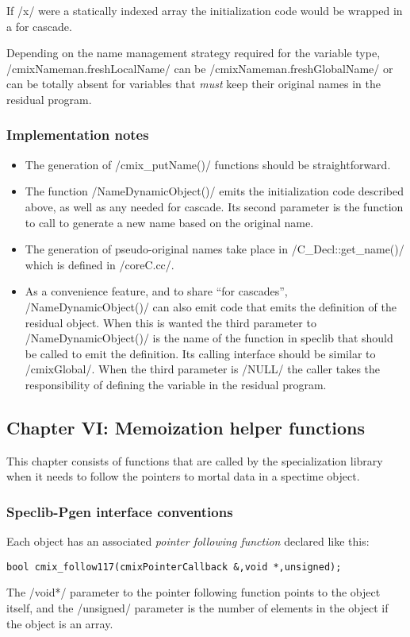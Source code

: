 \begin{docpart}
If /x/ were a statically indexed array the initialization code would
be wrapped in a for cascade.

Depending on the name management strategy required for the variable
type, /cmixNameman.freshLocalName/ can be
/cmixNameman.freshGlobalName/ or can be totally absent for variables that
\emph{must} keep their original names in the residual program.

\subsubsection{Implementation notes}
\begin{itemize}
\item The generation of /cmix_putName()/ functions should be
straightforward.
\item The function /NameDynamicObject()/ emits the initialization code
described above, as well as any needed for cascade. Its second
parameter is the function to call to generate a new name based on
the original name.
\item The generation of pseudo-original names take place in
/C_Decl::get_name()/ which is defined in /coreC.cc/.
\item As a convenience feature, and to share ``for cascades'',
/NameDynamicObject()/ can also emit code that emits the definition
of the residual object. When this is wanted the third parameter
to /NameDynamicObject()/ is the name of the function in speclib that
should be called to emit the definition. Its calling interface should
be similar to /cmixGlobal/. When the third parameter is /NULL/ the
caller takes the responsibility of defining the variable in the
residual program.
\end{itemize}

\subsection{Chapter VI: Memoization helper functions}
This chapter consists of functions that are called by the
specialization library when it needs to follow the
pointers to mortal data in a spectime object.

\subsubsection{Speclib-Pgen interface conventions}
Each object
has an associated \emph{pointer following function} declared
like this:
\begin{verbatim}
bool cmix_follow117(cmixPointerCallback &,void *,unsigned);
\end{verbatim}
The /void*/
parameter to the pointer following function points to the object
itself, and the /unsigned/ parameter is the number of elements in
the object if the object is an array.


\end{docpart}
